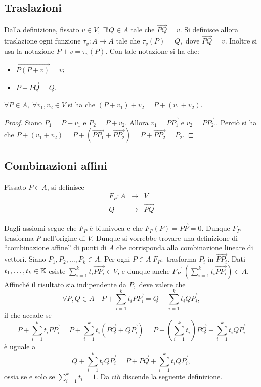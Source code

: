\documentclass[a4paper,12pt]{article}
\newcommand{\Got}[1]{#1}
\newcommand{\got}[1]{{#1}}
\newcommand{\vet}[1]{\overrightarrow{#1}}
\begin{document}
	\subsection{Traslazioni}
 
 \Got{Dalla definizione, fissato} $\got{v\in V,\;\exists !Q\in A}$ \Got{tale che} $\got{\vet{PQ}=\got{v}}$.
 \Got{Si definisce allora traslazione ogni funzione} $\got{\tau_v:A\to A}$ \Got{tale che} $\got{\tau_v(P)=Q,}$ \Got{dove} $\vet{PQ}=\got{v}$.
 \Got{Inoltre si usa la notazione} $\got{P+v=\tau_v(P)}$.
 \Got{Con tale notazione si ha che:}
 \begin{itemize}
	\item $\vet{P(P+v)}=\got {v}$;
	\item $\got{P}+\vet{PQ}=\got{Q}$.
 \end{itemize}
 
 \begin{lemma}
 \Got{}$\got{\forall P\in A,\; \forall v_1,v_2\in V}$ \Got{si ha che} $\got{(P+v_1)+v_2=P+(v_1+v_2).}$
 \end{lemma}
 
 \begin{proof}
 \Got{Siano} $\got{P_1=P+v_1}$ \Got{e} $\got{P_2=P+v_2}$. \Got{Allora} $\got{v_1=\vet{PP_1}}$ \Got{e}
 $\got{v_2=\vet{PP_2}.}$.
 \Got{Perciò si ha che} $\got{P+(v_1+v_2)=P+(\vet{PP_1}+\vet{PP_2})=P+\vet{PP_2}=P_2}$.
 \end{proof}
 
	\subsection{Combinazioni affini}
 
 \Got{Fissato} $\got{P\in A}$, \Got{si definisce}
 \begin{eqnarray*}
  \got{F_P:} \got{A} & \to & \got{V} \\
  \got{Q} & \mapsto & \vet{PQ}
 \end{eqnarray*}
 
 \Got{Dagli assiomi segue che} $\got{F_P}$ \Got{è biunivoca e che} $\got{F_P(P)=\vet{PP}=0}$. \Got{Dunque} $\got{F_P}$ \Got{trasforma}
 $\got{P}$ \Got{nell'origine di} $\got{V}$.
 \Got{Dunque si vorrebbe trovare una definizione di ``combinazione affine'' di punti di} $\got{A}$ \Got{che corrisponda alla combinazione
 lineare di vettori. Siano} $\got{P_1,P_2,\ldots,P_k\in A}$. \Got{Per ogni} $\got{P\in A\; F_P:}$ \Got{trasforma}
 $\got{P_i}$ \Got{in} $\vet{PP_i}$.
 \Got{Dati} $\got{t_1,\ldots,t_k\in \K}$ \Got{esiste} $\got{\sum_{i=1}^kt_i\vet{PP_i}\in V}$, \Got{e dunque anche}
 $\got{F_P^{-1}(\sum_{i=1}^kt_i\vet{PP_i})\in A}$.
 \Got{Affinché il risultato sia indipendente da} $\got{P,}$ \Got{deve valere che}
 $$\got{\forall P,Q\in A\quad P+\sum_{i=1}^kt_i\vet{PP_i}=Q+\sum_{i=1}^kt_i\vet{QP_i},}$$
 \Got{il che accade se}
 $$\got{P+\sum_{i=1}^kt_i\vet{PP_i}=P+\sum_{i=1}^kt_i(\vet{PQ}+\vet{QP_i})=P+\left(\sum_{i=1}^kt_i\right)\vet{PQ}+\sum_{i=1}^kt_i\vet{QP_i}}$$
 \Got{è uguale a}
 $$\got{Q+\sum_{i=1}^kt_i\vet{QP_i}=P+\vet{PQ}+\sum_{i=1}^kt_i\vet{QP_i},}$$
 \Got{ossia se e solo se} $\got{\sum_{i=1}^kt_i=1}$.
 \Got{Da ciò discende la seguente definizione.}
 
\end{document}

